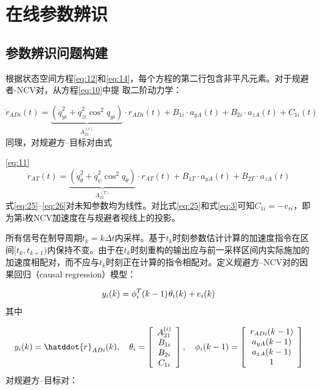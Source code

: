 \section{在线参数辨识}
\subsection{参数辨识问题构建}
根据状态空间方程\eqref{eq:12}和\eqref{eq:14}，每个方程的第二行包含非平凡元素。对于规避者-NCV对，从方程\eqref{eq:10}中提        取二阶动力学：

\begin{equation}
\label{eq:25}
{\ddot r_{ADi}}(t) = \underbrace {(\dot q_{yi}^2 + \dot q_{zi}^2{{\cos }^2}{q_{yi}})}_{A_{21}^{(i)}} \cdot {r_{ADi}}(t) + {B_{1i}} \cdot {a_{yA}}(t) + {B_{2i}} \cdot {a_{zA}}(t) + {C_{1i}}(t)
\end{equation}
同理，对规避方–目标对由式

\eqref{eq:11}\begin{equation}
\label{eq:26}
{\ddot r_{AT}}(t) = \underbrace {(\dot q_\theta ^2 + \dot q_\psi ^2{{\cos }^2}{q_\theta })}_{A_{21}^{(T)}} \cdot {r_{AT}}(t) + {B_{1T}} \cdot {a_{yA}}(t) + {B_{2T}} \cdot {a_{zA}}(t)
\end{equation}
式\eqref{eq:25}–\eqref{eq:26}对未知参数均为线性。对比式\eqref{eq:25}和式\eqref{eq:3}可知${C_{1i}} =  - {v_{ri}}$，即为第i枚NCV加速度在与规避者视线上的投影。

所有信号在制导周期${t_k} = k\Delta t$内采样。基于${t_k}$时刻参数估计计算的加速度指令在区间$[{t_k},{t_{k + 1}})$内保持不变。由于在${t_k}$时刻重构的输出应与前一采样区间内实际施加的加速度相配对，而不应与${t_k}$时刻正在计算的指令相配对。定义规避方–NCV对的因果回归（causal regression）模型：

\begin{equation}
\label{eq:27}
{y_i}(k) = \phi _i^T(k - 1){\kern 1pt} {\theta _i}(k) + {e_i}(k)
\end{equation}
其中

\begin{equation}
\label{eq:28}
{y_i}(k) = \hatddot{r}_{ADi}(k),\quad {\theta _i} = \left[ {\begin{array}{*{20}{c}}
  {A_{21}^{(i)}} \\ 
  {{B_{1i}}} \\ 
  {{B_{2i}}} \\ 
  {{C_{1i}}} 
\end{array}} \right],\quad {\phi _i}(k - 1) = \left[ {\begin{array}{*{20}{c}}
  {{r_{ADi}}(k - 1)} \\ 
  {{a_{yA}}(k - 1)} \\ 
  {{a_{zA}}(k - 1)} \\ 
  1 
\end{array}} \right]
\end{equation}
对规避方–目标对：

